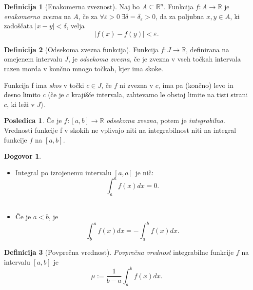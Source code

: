 \documentclass[11pt]{article}
\theoremstyle{definition}
\newtheorem{definicija}{Definicija}[section]
\theoremstyle{definition}
\theoremstyle{definition}
\theoremstyle{theorem}
\newtheorem*{posledica}{Posledica}
\newtheorem*{dogovor}{Dogovor}
\begin{document}
\begin{definicija}[Enakomerna zveznost]

Naj bo $A \subseteq \mathbb{R}^n$. Funkcija $f: A \rightarrow \mathbb{R}$ je \textit{enakomerno zvezna} na $A$, če za $\forall \varepsilon > 0 ~ \exists \delta = \delta_\varepsilon > 0$, da za poljubna $x, y \in A$, ki zadoščata $|x-y| < \delta$, velja
$$|f(x) - f(y)| < \varepsilon.$$ 

\end{definicija}
\vspace{0.5cm}

\begin{definicija}[Odsekoma zvezna funkcija]

Funkcija $f: J \rightarrow \mathbb{R}$, definirana na omejenem intervalu $J$, je \textit{odsekoma zvezna}, če je zvezna v vseh točkah intervala razen morda v končno mnogo točkah, kjer ima skoke.

Funkcija f ima \textit{skos} v točki $c \in J$, če $f$ ni zvezna v $c$, ima pa (končno) levo in desno limito $c$ (če je $c$ krajišče intervala, zahtevamo le obstoj limite na tisti strani $c$, ki leži v $J$). 

\end{definicija}

\begin{posledica}

Če je $f:[a, b] \rightarrow \mathbb{R}$ \textit{odsekoma zvezna}, potem je \textit{integrabilna}. Vrednosti funkcije f v skokih ne vplivajo niti na integrabilnost niti na integral funkcije $f$ na $[a, b]$.

\end{posledica}
\vspace{0.5cm}

\begin{dogovor}
~
	\begin{itemize}
		\item Integral po izrojenemu intervalu $[a, a]$ je nič: 
		$$\int_{a}^{a} f(x) dx = 0.$$ \\
		\item Če je $a < b$, je 
		$$\int_{b}^{a} f(x) dx = - \int_{a}^{b} f(x) dx.$$
	\end{itemize}
\end{dogovor}
\vspace{0.5cm}

\begin{definicija}[Povprečna vrednost]

\textit{Povprečna vrednost} integrabilne funkcije $f$ na intervalu $[a, b]$ je 
$$\mu := \frac{1}{b-a} \int_{a}^{b} f(x) dx.$$

\end{definicija}
\vspace{0.5cm}
\end{document}
